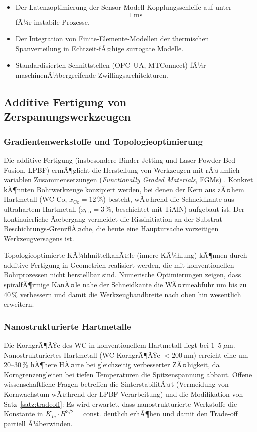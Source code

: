 ﻿\documentclass[a4paper,12pt]{article}
\theoremstyle{definition}
\begin{document}
\begin{itemize}
  \item Der Latenzoptimierung der Sensor-Modell-Kopplungsschleife auf
        unter $$1\,\mathrm{ms}$$ fÃ¼r instabile Prozesse.
  \item Der Integration von Finite-Elemente-Modellen der thermischen
        Spanverteilung in Echtzeit-fÃ¤hige surrogate Modelle.
  \item Standardisierten Schnittstellen (OPC~UA, MTConnect) fÃ¼r
        maschinenÃ¼bergreifende Zwillingsarchitekturen.
\end{itemize}

\subsection{Additive Fertigung von Zerspanungswerkzeugen}

\subsubsection{Gradientenwerkstoffe und Topologieoptimierung}

Die additive Fertigung (insbesondere Binder Jetting und Laser Powder Bed
Fusion, LPBF) ermÃ¶glicht die Herstellung von Werkzeugen mit rÃ¤umlich variablen
Zusammensetzungen (\emph{Functionally Graded Materials}, FGMs) \cite{yan2017}.
Konkret kÃ¶nnten Bohrwerkzeuge konzipiert werden, bei denen der Kern aus
zÃ¤hem Hartmetall (WC-Co, $x_{\text{Co}} = 12\,\%$) besteht, wÃ¤hrend die
Schneidkante aus ultrahartem Hartmetall ($x_{\text{Co}} = 3\,\%$, beschichtet
mit TiAlN) aufgebaut ist. Der kontinuierliche Ãœbergang vermeidet die Rissinitiation
an der Substrat-Beschichtungs-GrenzflÃ¤che, die heute eine Hauptursache
vorzeitigen Werkzeugversagens ist.

Topologieoptimierte KÃ¼hlmittelkanÃ¤le (innere KÃ¼hlung) kÃ¶nnen durch additive
Fertigung in Geometrien realisiert werden, die mit konventionellen Bohrprozessen
nicht herstellbar sind. Numerische Optimierungen zeigen, dass spiralfÃ¶rmige
KanÃ¤le nahe der Schneidkante die WÃ¤rmeabfuhr um bis zu 40\,\% verbessern
\cite{bier2020} und damit die Werkzeugbandbreite nach oben hin wesentlich
erweitern.

\subsubsection{Nanostrukturierte Hartmetalle}

Die KorngrÃ¶ÃŸe des WC in konventionellem Hartmetall liegt bei $1\text{--}5~\mu\text{m}$.
Nanostrukturiertes Hartmetall (WC-KorngrÃ¶ÃŸe $< 200~\text{nm}$) erreicht eine
um 20--30\,\% hÃ¶here HÃ¤rte bei gleichzeitig verbesserter ZÃ¤higkeit, da
Korngrenzengleiten bei tiefen Temperaturen die Spitzenspannung abbaut.
Offene wissenschaftliche Fragen betreffen die SinterstabilitÃ¤t (Vermeidung
von Kornwachstum wÃ¤hrend der LPBF-Verarbeitung) und die Modifikation von
Satz~\ref{satz:tradeoff}: Es wird erwartet, dass nanostrukturierte Werkstoffe
die Konstante in $K_{Ic} \cdot H^{3/2} = \text{const.}$ deutlich erhÃ¶hen
und damit den Trade-off partiell Ã¼berwinden.
\end{document}
